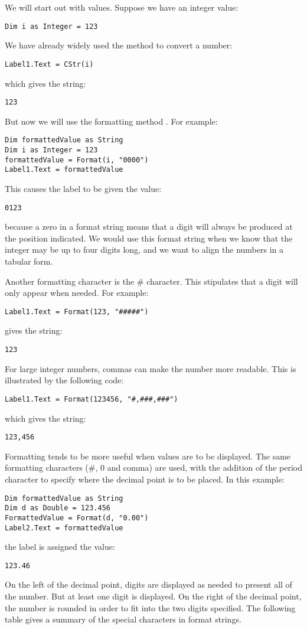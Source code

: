 		We will start out with  values. Suppose we have an integer value:
		\begin{lstlisting}
Dim i as Integer = 123
		\end{lstlisting}
		We have already widely used the  method to convert a number:
		\begin{lstlisting}
Label1.Text = CStr(i)
		\end{lstlisting}
		which gives the string:
		\begin{lstlisting}
123
		\end{lstlisting}
		But now we will use the formatting method . For example:
		\begin{lstlisting}
Dim formattedValue as String
Dim i as Integer = 123
formattedValue = Format(i, "0000")
Label1.Text = formattedValue
		\end{lstlisting}
		This causes the label to be given the value:
		\begin{lstlisting}
0123
		\end{lstlisting}
		because a zero in a format string means that a digit will always be produced at the position indicated. We would use this format string when we know that the integer may be up to four digits long, and we want to align the numbers in a tabular form.
		
		Another formatting character is the \# character. This stipulates that a digit will only appear when needed. For example:
		\begin{lstlisting}
Label1.Text = Format(123, "#####")
		\end{lstlisting}
gives the string:
		\begin{lstlisting}
123
		\end{lstlisting}
		For large integer numbers, commas can make the number more readable. This is illustrated by the following code:
		\begin{lstlisting}
Label1.Text = Format(123456, "#,###,###")
		\end{lstlisting}
		which gives the string:
		\begin{lstlisting}
123,456
		\end{lstlisting}
		Formatting tends to be more useful when  values are to be displayed. The same formatting characters (\#, 0 and comma) are used, with the addition of the period character to specify where the decimal point is to be placed. In this example:
		\begin{lstlisting}
Dim formattedValue as String
Dim d as Double = 123.456
FormattedValue = Format(d, "0.00")
Label2.Text = formattedValue
		\end{lstlisting}
		the label is assigned the value:
		\begin{lstlisting}
123.46
		\end{lstlisting}
		On the left of the decimal point, digits are displayed as needed to present all of the number. But at least one digit is displayed. On the right of the decimal point, the number is rounded in order to fit into the two digits specified.
The following table gives a summary of the special characters in format strings.

